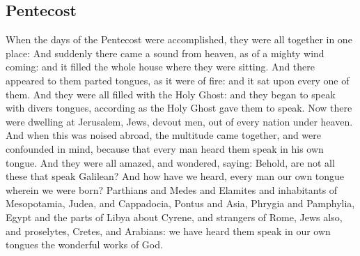 \begin{multicols}{2}
\section{Pentecost}



When the days of the Pentecost were accomplished, they were all together in
one place: And suddenly there came a sound from heaven, as of a mighty wind
coming: and it filled the whole house where they were sitting.  And there
appeared to them parted tongues, as it were of fire: and it sat upon every one
of them.  And they were all filled with the Holy Ghost: and they began to speak
with divers tongues, according as the Holy Ghost gave them to speak.  Now there
were dwelling at Jerusalem, Jews, devout men, out of every nation under heaven.
And when this was noised abroad, the multitude came together, and were
confounded in mind, because that every man heard them speak in his own tongue.
And they were all amazed, and wondered, saying: Behold, are not all these that
speak Galilean?  And how have we heard, every man our own tongue wherein we
were born?  Parthians and Medes and Elamites and inhabitants of Mesopotamia,
Judea, and Cappadocia, Pontus and Asia, Phrygia and Pamphylia, Egypt and the
parts of Libya about Cyrene, and strangers of Rome, Jews also, and proselytes,
Cretes, and Arabians: we have heard them speak in our own tongues the wonderful
works of God.




\end{multicols}
